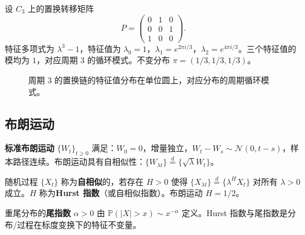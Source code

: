 \begin{example}[三状态置换链的特征值与周期]\label{ch14_markov_cycle_example}
设 $C_3$ 上的置换转移矩阵
\[
P = \begin{pmatrix} 0 & 1 & 0 \\ 0 & 0 & 1 \\ 1 & 0 & 0 \end{pmatrix}.
\]
特征多项式为 $\lambda^3 - 1$，特征值为 $\lambda_0 = 1$，$\lambda_1 = e^{2\pi i/3}$，$\lambda_2 = e^{4\pi i/3}$。三个特征值的模均为 $1$，对应周期 $3$ 的循环模式。不变分布 $\pi = (1/3, 1/3, 1/3)$。
\end{example}

\begin{figure}[htbp]
\centering
{}
\caption{周期 $3$ 的置换链的特征值分布在单位圆上，对应分布的周期循环模式。}
\label{fig:markov_cycle}
\end{figure}

\subsection{布朗运动}

\begin{definition}[布朗运动]\label{def:brownian_motion}
\textbf{标准布朗运动} $\{W_t\}_{t \ge 0}$ 满足：$W_0 = 0$，增量独立，$W_t - W_s \sim \mathcal{N}(0, t-s)$，样本路径连续。布朗运动具有自相似性：$\{W_{\lambda t}\} \stackrel{d}{=} \{\sqrt{\lambda} W_t\}$。
\end{definition}

\begin{definition}[自相似性与标度指数]\label{ch14_scale_invariance}
随机过程 $\{X_t\}$ 称为\textbf{自相似}的，若存在 $H > 0$ 使得 $\{X_{\lambda t}\} \stackrel{d}{=} \{\lambda^H X_t\}$ 对所有 $\lambda > 0$ 成立。$H$ 称为\textbf{Hurst 指数}（或自相似指数）。布朗运动 $H = 1/2$。

重尾分布的\textbf{尾指数} $\alpha > 0$ 由 $\mathbb{P}(|X| > x) \sim x^{-\alpha}$ 定义。Hurst 指数与尾指数是分布/过程在标度变换下的特征不变量。
\end{definition}

